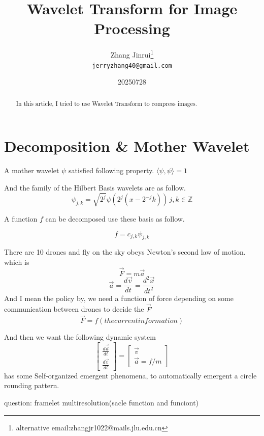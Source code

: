 \documentclass{article}
\title{Wavelet Transform for Image Processing}
\author{
Zhang Jinrui\thanks{alternative email:zhangjr1022@mails.jlu.edu.cn} \\ \texttt{jerryzhang40@gmail.com}
}
\date{20250728}  %
\theoremstyle{definition} %
\begin{document}
\maketitle

\begin{abstract}
    In this article, I tried to use
    Wavelet Transform to compress
    images.
\end{abstract}


\section{Decomposition \& Mother Wavelet}
A mother wavelet \(\psi\) satisfied
following property.
\(\langle\psi,\psi\rangle=1\)

And the family of the Hilbert Basis
wavelets are as follow.
\[
    \psi_{j,k}=\sqrt{2^j}\psi(2^j(x-2^{-j}k)) \, j,k\in \mathbb{Z}
\]

A function \(f\) can be decomposed
use these basis as follow.

\[
    f=c_{j,k}\psi_{j,k}
\]

There are 10 drones and fly on the sky
obeys Newton's second law of motion.
which is
\[
    \vec{F} = m \vec{a}
\]
\[
    \vec{a} = \frac{d\vec{v}}{dt} = \frac{d^2 \vec{x}}{dt^2}
\]
And I mean the policy by, we need a function of force
depending on some communication between drones
to decide the \(\vec{F}\)
\[
    \vec{F}=f(the current information)
\]

And then we want the following dynamic system
\[\begin{bmatrix}
        \frac{d\vec{d}}{dt} \\
        \frac{d\vec{v}}{dt}
    \end{bmatrix}=
    \begin{bmatrix}
        \vec{v} \\
        \vec{a}=f/m
    \end{bmatrix}
\]
has some Self-organized emergent phenomena,
to automatically emergent a circle rounding pattern.

question: framelet multiresolution(sacle function and funciont)
\end{document}
